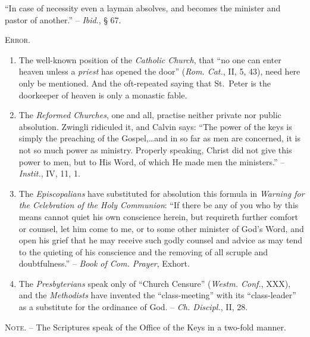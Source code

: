 \documentclass[
]{book}
\begin{document}
``In case of necessity even a layman absolves, and becomes the minister and pastor of another.'' -- \emph{Ibid}., § 67.

\begin{center}
\textsc{Error.}
\end{center}

\begin{enumerate}
\def\labelenumi{\arabic{enumi}.}
\item
  The well-known position of the \emph{Catholic Church}, that ``no one can enter heaven unless a \emph{priest} has opened the door'' (\emph{Rom. Cat.}, II, 5, 43), need here only be mentioned. And the oft-repeated saying that St.~Peter is the doorkeeper of heaven is only a monastic fable.
\item
  The \emph{Reformed Churches}, one and all, practise neither private nor public absolution. Zwingli ridiculed it, and Calvin says: ``The power of the keys is simply the preaching of the Gospel,\ldots and in so far as men are concerned, it is not so much power as ministry. Properly speaking, Christ did not give this power to men, but to His Word, of which He made men the ministers.'' -- \emph{Instit.}, IV, 11, 1.
\item
  The \emph{Episcopalians} have substituted for absolution this formula in \emph{Warning for the Celebration of the Holy Communion}: ``If there be any of you who by this means cannot quiet his own conscience herein, but requireth further comfort or counsel, let him come to me, or to some other minister of God's Word, and open his grief that he may receive such godly counsel and advice as may tend to the quieting of his conscience and the removing of all scruple and doubtfulness.'' -- \emph{Book of Com. Prayer}, Exhort.
\item
  The \emph{Presbyterians} speak only of ``Church Censure'' (\emph{Westm. Conf.}, XXX), and the \emph{Methodists} have invented the ``class-meeting'' with its ``class-leader'' as a substitute for the ordinance of God. -- \emph{Ch. Discipl.}, II, 28.
\end{enumerate}

\textsc{Note. --} The Scriptures speak of the Office of the Keys in a two-fold manner.
\end{document}
